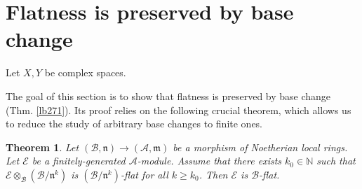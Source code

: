 \documentclass[12pt,b5paper,notitlepage]{report}
\theoremstyle{definition}
\theoremstyle{plain}
\newtheorem{thm}[df]{Theorem}
\newcommand{\fk}{\mathfrak}
\newcommand{\mc}{\mathcal}
\newcommand{\Nbb}{\mathbb N}
\numberwithin{equation}{section}
\begin{document}
\section{Flatness is preserved by base change}


Let $X,Y$ be complex spaces.

The goal of this section is to show that flatness is preserved by base change (Thm. \ref{lb271}). Its proof relies on the following crucial theorem, which allows us to reduce the study of arbitrary base changes to finite ones.



\begin{thm}\label{lb267}
Let $(\mc B,\fk n)\rightarrow(\mc A,\fk m)$ be a morphism of Noetherian local rings. Let $\mc E$ be a finitely-generated $\mc A$-module. Assume that there exists $k_0\in\Nbb$ such that $\mc E\otimes_{\mc B}(\mc B/\fk n^k)$ is $(\mc B/\fk n^k)$-flat for all $k\geq k_0$. Then $\mc E$ is $\mc B$-flat.
\end{thm}
\end{document}
